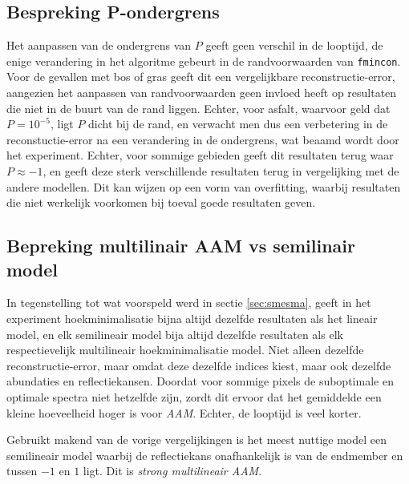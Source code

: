 \documentclass[12pt]{report}
\begin{document}
\subsection{Bespreking P-ondergrens}

Het aanpassen van de ondergrens van $P$ geeft geen verschil in de looptijd, de enige verandering in het algoritme gebeurt in de randvoorwaarden van \texttt{fmincon}. Voor de gevallen met bos of gras geeft dit een vergelijkbare reconstructie-error, aangezien het aanpassen van randvoorwaarden geen invloed heeft op resultaten die niet in de buurt van de rand liggen. Echter, voor asfalt, waarvoor geld dat $P=10^{-5}$, ligt $P$ dicht bij de rand, en verwacht men dus een verbetering in de reconstuctie-error na een verandering in de ondergrens, wat beaamd wordt door het experiment. Echter, voor sommige gebieden geeft dit resultaten terug waar $P \approx -1$, en geeft deze sterk verschillende resultaten terug in vergelijking met de andere modellen. Dit kan wijzen op een vorm van overfitting, waarbij resultaten die niet werkelijk voorkomen bij toeval goede resultaten geven.

\subsection{Bepreking multilinair AAM vs semilinair model}

In tegenstelling tot wat voorspeld werd in sectie \ref{sec:smesma}, geeft in het experiment hoekminimalisatie bijna altijd dezelfde resultaten als het lineair model, en elk semilineair model bija altijd dezelfde resultaten als elk respectievelijk multilineair hoekminimalisatie model. Niet alleen dezelfde reconstructie-error, maar omdat deze dezelfde indices kiest, maar ook dezelfde abundaties en reflectiekansen. Doordat voor sommige pixels de suboptimale en optimale spectra niet hetzelfde zijn, zordt dit ervoor dat het gemiddelde een kleine hoeveelheid hoger is voor \textit{AAM}. Echter, de looptijd is veel korter. 

\vspace{5 mm}

Gebruikt makend van de vorige vergelijkingen is het meest nuttige model een semilineair model waarbij de reflectiekans onafhankelijk is van de endmember en tussen $-1$ en $1$ ligt. Dit is \textit{strong multilineair AAM}.


\begin{flushleft}
\nocite{*}
{}


\end{flushleft}
\end{document}

